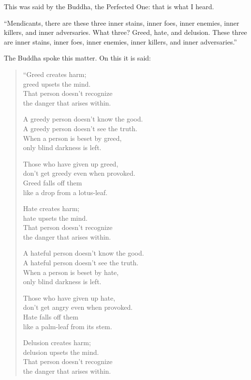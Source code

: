 \documentclass[12pt,openany]{book}%
\begin{document}
This was said by the Buddha, the Perfected One: that is what I heard. 

“Mendicants, there are these three inner stains, inner foes, inner enemies, inner killers, and inner adversaries. What three? Greed, hate, and delusion. These three are inner stains, inner foes, inner enemies, inner killers, and inner adversaries.” 

The Buddha spoke this matter. On this it is said: 

\begin{verse}%
“Greed creates harm; \\
greed upsets the mind. \\
That person doesn’t recognize \\
the danger that arises within. 

A greedy person doesn’t know the good. \\
A greedy person doesn’t see the truth. \\
When a person is beset by greed, \\
only blind darkness is left. 

Those who have given up greed, \\
don’t get greedy even when provoked. \\
Greed falls off them \\
like a drop from a lotus-leaf. 

Hate creates harm; \\
hate upsets the mind. \\
That person doesn’t recognize \\
the danger that arises within. 

A hateful person doesn’t know the good. \\
A hateful person doesn’t see the truth. \\
When a person is beset by hate, \\
only blind darkness is left. 

Those who have given up hate, \\
don’t get angry even when provoked. \\
Hate falls off them \\
like a palm-leaf from its stem. 

Delusion creates harm; \\
delusion upsets the mind. \\
That person doesn’t recognize \\
the danger that arises within. 


\end{verse}
\end{document}
